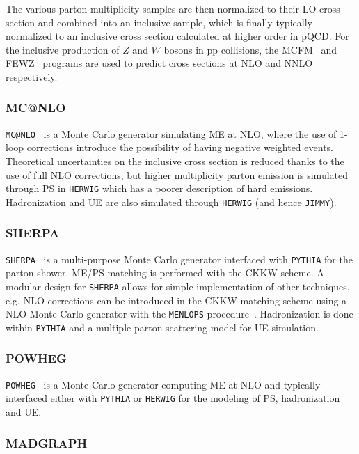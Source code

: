 The various parton multiplicity samples are then normalized to their LO cross section
and combined into an inclusive sample, which is finally typically normalized 
to an inclusive cross section calculated at higher order in pQCD. 
For the inclusive production of $Z$ and $W$ bosons in pp collisions, the 
MCFM~\cite{MCFM} and FEWZ~\cite{Gavin:2010az} programs are used to predict 
cross sections at NLO and NNLO respectively.


\subsubsection*{MC@NLO}

\texttt{MC@NLO}~\cite{mcatnlo} is a Monte Carlo generator simulating ME at
NLO, where the use of 1-loop corrections introduce the possibility of having
negative weighted events. Theoretical uncertainties on the inclusive cross
section is reduced thanks to the use of full NLO corrections, but higher multiplicity
parton emission is simulated through PS in \texttt{HERWIG} which has
a poorer description of hard emissions. 
Hadronization and UE are also simulated through \texttt{HERWIG}
(and hence \texttt{JIMMY}).

\subsubsection*{SHERPA}

\texttt{SHERPA}~\cite{sherpa} is a multi-purpose Monte Carlo generator
interfaced with \texttt{PYTHIA} for the parton shower. ME/PS matching
is performed with the CKKW scheme.
A modular design for \texttt{SHERPA} allows for  simple implementation
of other techniques, e.g. NLO corrections can be introduced in the
CKKW matching scheme using a NLO Monte Carlo generator with the
\texttt{MENLOPS} procedure~\cite{MENLOPS}.
Hadronization is done within \texttt{PYTHIA} and a multiple parton 
scattering model for UE simulation.


\subsubsection*{POWHEG}

\texttt{POWHEG}~\cite{powheg} is a Monte Carlo generator computing
ME at NLO and typically interfaced either with \texttt{PYTHIA} or 
\texttt{HERWIG} for the modeling of PS, hadronization and UE.


\subsubsection*{MADGRAPH}

